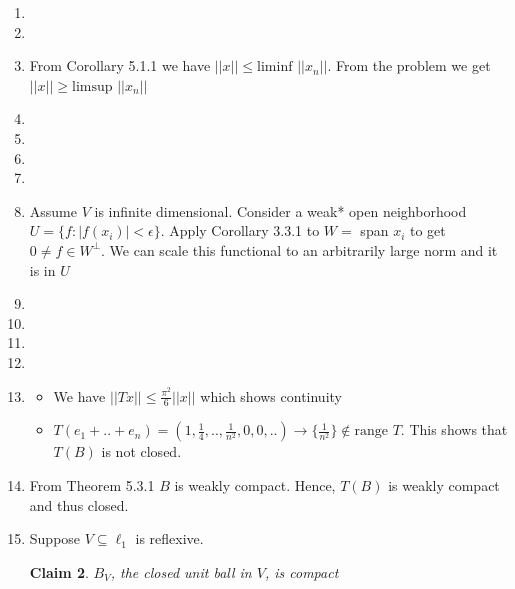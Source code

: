 \documentclass{article}
\newtheorem*{claim}{Claim}
\begin{document}
\begin{enumerate}
    \begin{claim}
        in $\ell_\infty$ we have $e_n\rightharpoonup0$
    \end{claim}

    \begin{proof}
        Let $f \in (\ell_\infty)^*$. Since $f_{|c_0} \in (c_0)^*$ we have $fe_n \to 0$ by the previous claim.
    \end{proof}

    \item 
    \item 
    
    \item From Corollary 5.1.1 we have $||x|| \leq \text{liminf }||x_n||$. From the problem we get $||x|| \geq \text{limsup }||x_n||$

    \item 
    \item 
    \item
    \item
    
    \item Assume $V$ is infinite dimensional. Consider a weak* open neighborhood $U=\{f:|f(x_i)|<\epsilon\}$. Apply Corollary 3.3.1 to $W=$ span $x_i$ to get $0 \neq f \in W^\perp$. We can scale this functional to an arbitrarily large norm and it is in $U$
    
    \item 
    \item 
    \item 
    \item 
    
    \item \begin{itemize}
        \item We have $||Tx|| \leq \frac{\pi^2}{6}||x||$ which shows continuity
        
        \item $T(e_1+..+e_n)=(1,\frac{1}{4},..,\frac{1}{n^2},0,0,..) \to \{\frac{1}{n^2}\} \notin \text{range }T$. This shows that $T(B)$ is not closed.
    \end{itemize}
    
    \item From Theorem 5.3.1 $B$ is weakly compact. Hence, $T(B)$ is weakly compact and thus closed.
    
    \item Suppose $V \subseteq \ell_1$ is reflexive.
    \begin{claim}
        $B_V$, the closed unit ball in $V$, is compact
    \end{claim}


\end{enumerate}
\end{document}
